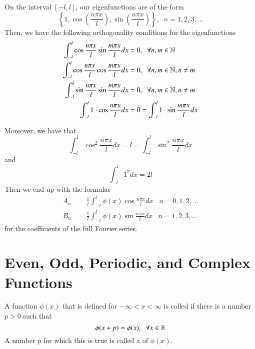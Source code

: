 \begin{proposition}
    On the interval $[-l,l]$, our eigenfunctions are of the form \begin{equation*}
        \left\{1, \cos\left(\frac{n\pi x}{l}\right),\sin\left(\frac{n\pi x}{l}\right)\right\},\;\;n=1,2,3,...
    \end{equation*}
    Then, we have the following orthogonality conditions for the eigenfunctions \begin{align*}
        \int_{-l}^l\cos\frac{n\pi x}{l}\sin\frac{m\pi x}{l}dx &= 0,\;\;\forall n,m \in \mathbb N \\
        \int_{-l}^l\cos\frac{n\pi x}{l}\cos\frac{m\pi x}{l}dx &= 0,\;\;\forall n,m \in \mathbb N, n\neq m \\
        \int_{-l}^l\sin\frac{n\pi x}{l}\sin\frac{m\pi x}{l}dx &= 0,\;\;\forall n,m \in \mathbb N, n \neq m \\
        \int_{-l}^l1\cdot \cos\frac{n\pi x}{l}dx &= 0 = \int_{-l}^l1\cdot \sin\frac{m \pi x}{l}dx
    \end{align*}
\end{proposition}
Moreover, we have that \begin{equation*}
    \int_{-l}^l\cos^2\frac{n\pi x}{l}dx = l = \int_{-l}^l\sin^2\frac{n\pi x}{l}dx
\end{equation*}
and \begin{equation*}
    \int_{-l}^l1^2dx = 2l
\end{equation*}
Then we end up with the formulas \begin{align}
    A_n &= \frac{1}{l}\int_{-l}^l\phi(x)\cos\frac{n\pi x}{l}dx\;\;\;n=0,1,2,... \\
    B_n &= \frac{1}{l}\int_{-l}^l\phi(x)\sin\frac{n\pi x}{l}dx\;\;\;n=1,2,3,...
\end{align}
for the coefficients of the full Fourier series.


\section{Even, Odd, Periodic, and Complex Functions}

\begin{definition}
    A function $\phi(x)$ that is defined for $-\infty < x < \infty$ is called  if there is a number $p > 0$ such that \begin{equation*}
        \phi(x+p) = \phi(x),\;\;\forall x \in \mathbb R
    \end{equation*}
    A number $p$ for which this is true is called a  of $\phi(x)$.
\end{definition}

